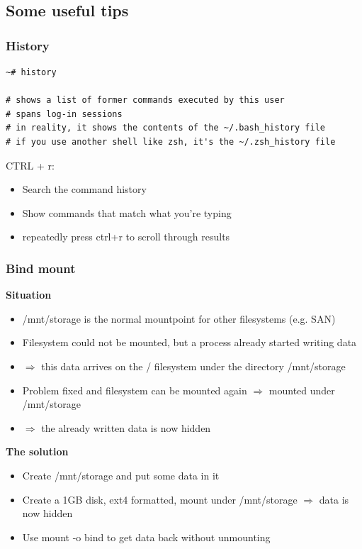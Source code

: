 \documentclass{article}
\begin{document}
\subsection{Some useful tips}

\subsubsection{History}

\begin{verbatim}
~# history

# shows a list of former commands executed by this user
# spans log-in sessions
# in reality, it shows the contents of the ~/.bash_history file
# if you use another shell like zsh, it's the ~/.zsh_history file
\end{verbatim}

CTRL + r:

\begin{itemize}
    \item Search the command history
    \item Show commands that match what you're typing
    \item repeatedly press ctrl+r to scroll through results
\end{itemize}


\subsubsection{Bind mount}

\textbf{Situation}

\begin{itemize}
    \item /mnt/storage is the normal mountpoint for other filesystems (e.g. SAN)
    \item Filesystem could not be mounted, but a process already started writing data
    \item $\Rightarrow$ this data arrives on the / filesystem under the directory /mnt/storage
    \item Problem fixed and filesystem can be mounted again $\Rightarrow$ mounted under /mnt/storage
    \item $\Rightarrow$ the already written data is now hidden
\end{itemize}

\textbf{The solution}

\begin{itemize}
    \item Create /mnt/storage and put some data in it
    \item Create a 1GB disk, ext4 formatted, mount under /mnt/storage $\Rightarrow$ data is now hidden
    \item Use mount -o bind to get data back without unmounting
\end{itemize}
\end{document}
